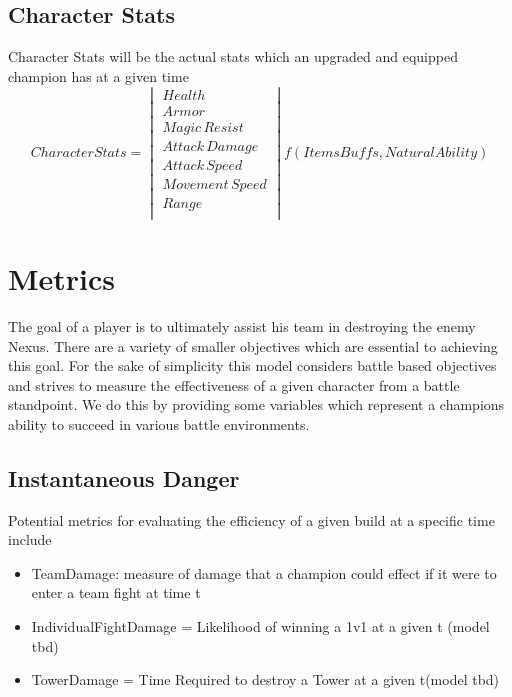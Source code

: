 \documentclass{article}
\begin{document}
\subsection{Character Stats}
Character Stats will be the actual stats which an upgraded and equipped champion has at a given time
\begin{equation}
Character Stats = 
\begin{vmatrix}
	Health\\
	Armor \\
	Magic\hspace{2pt} Resist\\
	Attack\hspace{2pt} Damage\\
	Attack\hspace{2pt} Speed\\
	Movement \hspace{2pt} Speed \\
	Range \\
\end{vmatrix}
f (Items Buffs, Natural Ability)
\end{equation}


\newpage


\section{Metrics}
The goal of a player is to ultimately assist his team in destroying the enemy Nexus.  There are a variety of smaller objectives which are essential to achieving this goal.  For the sake of simplicity this model considers battle based objectives and strives to  measure the effectiveness of a given character from a battle standpoint.  We do this by providing some variables which represent a champions ability to succeed in various battle environments.
\subsection{Instantaneous Danger}
Potential metrics for evaluating the efficiency of a given build at a specific time include\\
\begin{itemize}
	\item  TeamDamage:  measure of damage that a champion could effect if it were to enter a team fight at time t
	\item  IndividualFightDamage = Likelihood of winning a 1v1 at a given t  (model tbd)
	\item TowerDamage = Time Required to destroy a Tower at a given t(model tbd)
\end{itemize}
\end{document}
